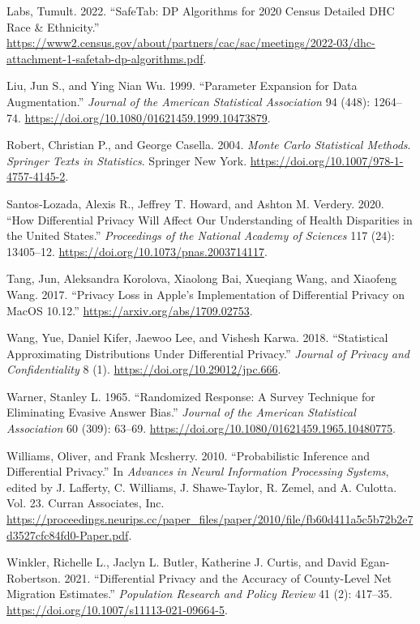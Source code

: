 \begin{CSLReferences}{1}{0}
\leavevmode{}%
Labs, Tumult. 2022. {``SafeTab: DP Algorithms for 2020 Census Detailed DHC Race \& Ethnicity.''} \url{https://www2.census.gov/about/partners/cac/sac/meetings/2022-03/dhc-attachment-1-safetab-dp-algorithms.pdf}.

\leavevmode{}%
Liu, Jun S., and Ying Nian Wu. 1999. {``Parameter Expansion for Data Augmentation.''} \emph{Journal of the American Statistical Association} 94 (448): 1264--74. \url{https://doi.org/10.1080/01621459.1999.10473879}.

\leavevmode{}%
Robert, Christian P., and George Casella. 2004. \emph{Monte Carlo Statistical Methods}. \emph{Springer Texts in Statistics}. Springer New York. \url{https://doi.org/10.1007/978-1-4757-4145-2}.

\leavevmode{}%
Santos-Lozada, Alexis R., Jeffrey T. Howard, and Ashton M. Verdery. 2020. {``How Differential Privacy Will Affect Our Understanding of Health Disparities in the United States.''} \emph{Proceedings of the National Academy of Sciences} 117 (24): 13405--12. \url{https://doi.org/10.1073/pnas.2003714117}.

\leavevmode{}%
Tang, Jun, Aleksandra Korolova, Xiaolong Bai, Xueqiang Wang, and Xiaofeng Wang. 2017. {``Privacy Loss in Apple's Implementation of Differential Privacy on MacOS 10.12.''} \url{https://arxiv.org/abs/1709.02753}.

\leavevmode{}%
Wang, Yue, Daniel Kifer, Jaewoo Lee, and Vishesh Karwa. 2018. {``Statistical Approximating Distributions Under Differential Privacy.''} \emph{Journal of Privacy and Confidentiality} 8 (1). \url{https://doi.org/10.29012/jpc.666}.

\leavevmode{}%
Warner, Stanley L. 1965. {``Randomized Response: A Survey Technique for Eliminating Evasive Answer Bias.''} \emph{Journal of the American Statistical Association} 60 (309): 63--69. \url{https://doi.org/10.1080/01621459.1965.10480775}.

\leavevmode{}%
Williams, Oliver, and Frank Mcsherry. 2010. {``Probabilistic Inference and Differential Privacy.''} In \emph{Advances in Neural Information Processing Systems}, edited by J. Lafferty, C. Williams, J. Shawe-Taylor, R. Zemel, and A. Culotta. Vol. 23. Curran Associates, Inc. \url{https://proceedings.neurips.cc/paper_files/paper/2010/file/fb60d411a5c5b72b2e7d3527cfc84fd0-Paper.pdf}.

\leavevmode{}%
Winkler, Richelle L., Jaclyn L. Butler, Katherine J. Curtis, and David Egan-Robertson. 2021. {``Differential Privacy and the Accuracy of County-Level Net Migration Estimates.''} \emph{Population Research and Policy Review} 41 (2): 417--35. \url{https://doi.org/10.1007/s11113-021-09664-5}.

\end{CSLReferences}


